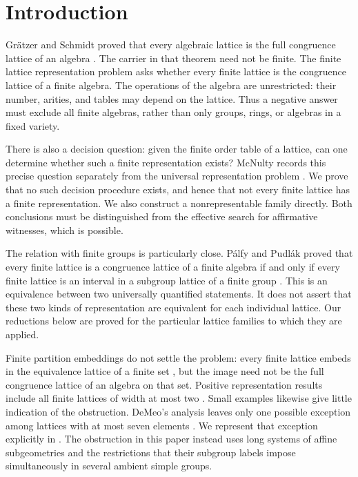 \section{Introduction}\label{sec:introduction}

Gr\"atzer and Schmidt proved that every algebraic lattice is the full
congruence lattice of an algebra \citep[Theorem~I]{GratzerSchmidt1963}.
The carrier in that theorem need not be finite.  The finite lattice
representation problem asks whether every finite lattice is
the congruence lattice of a finite algebra.  The operations of the algebra are
unrestricted: their number, arities, and tables may depend on the lattice.
Thus a negative answer must exclude all finite algebras, rather than only
groups, rings, or algebras in a fixed variety.

There is also a decision question: given the finite order table of a
lattice, can one determine whether such a finite representation exists?
McNulty records this precise question separately from the universal
representation problem \citep[p.~30]{McNulty2015}.  We prove that no such
decision procedure exists, and hence that not every finite lattice has a
finite representation.  We also construct a nonrepresentable family
directly.  Both conclusions must be distinguished from the effective
search for affirmative witnesses, which is possible.

The relation with finite groups is particularly close.
P\'alfy and Pudl\'ak proved that every finite lattice is a congruence lattice
of a finite algebra if and only if every finite lattice is an interval in a
subgroup lattice of a finite group \citep[Theorem~2]{PalfyPudlak1980}.
This is an equivalence between two universally quantified statements.
It does not assert that these two kinds of representation are equivalent
for each individual lattice.  Our reductions below are proved for the
particular lattice families to which they are applied.

Finite partition embeddings do not settle the problem: every finite
lattice embeds in the equivalence lattice of a finite set
\citep[Theorem~7.10]{PudlakTuma1980}, but the image need not be the full
congruence lattice of an algebra on that set.  Positive representation
results include all finite lattices of width at most two
\citep[Theorem~4.2]{Snow2000}.  Small examples likewise give little
indication of the obstruction.
DeMeo's analysis leaves only one possible exception among lattices with at
most seven elements \citep[Theorem~6.1.1 and Figure~6.2]{DeMeo2012}.
We represent that exception explicitly in .
The obstruction in this paper instead uses long systems of affine
subgeometries and the restrictions that their subgroup labels impose
simultaneously in several ambient simple groups.


